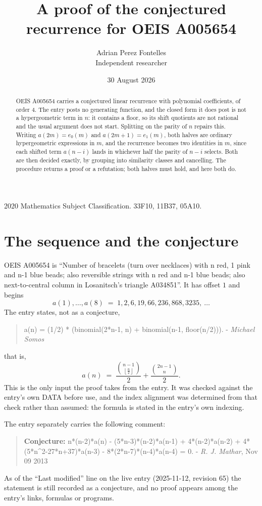 \documentclass[11pt,a4paper]{article}
\title{A proof of the conjectured recurrence for OEIS A005654}
\author{Adrian Perez Fontelles\\ \small Independent researcher}
\date{30 August 2026}
\theoremstyle{plain}
\theoremstyle{definition}
\begin{document}
\maketitle

\begin{abstract}
OEIS A005654 carries a conjectured linear recurrence with polynomial coefficients, of
order 4. The entry posts no generating function, and the closed form it does post
is not a hypergeometric term in $n$: it contains a floor, so its shift quotients are not
rational and the usual argument does not start. Splitting on the parity of $n$ repairs
this. Writing $a(2m)=e_{0}(m)$ and $a(2m+1)=e_{1}(m)$, both halves are ordinary
hypergeometric expressions in $m$, and the recurrence becomes two identities in $m$, since
each shifted term $a(n-i)$ lands in whichever half the parity of $n-i$ selects. Both are
then decided exactly, by grouping into similarity classes and cancelling. The procedure
returns a proof or a refutation; both halves must hold, and here both do.
\end{abstract}

\noindent\small 2020 Mathematics Subject Classification. 33F10, 11B37, 05A10.\normalsize

\section{The sequence and the conjecture}

OEIS A005654 is ``Number of bracelets (turn over necklaces) with n red, 1 pink and n-1 blue beads; also reversible strings with n red and n-1 blue beads; also next-to-central column in Losanitsch's triangle A034851''. It has offset $1$ and begins
\[
a(1),\dots,a(8)\;=\;1, 2, 6, 19, 66, 236, 868, 3235,\ \dots
\]
The entry states, not as a conjecture,
\begin{quote}\small
a(n) = (1/2) * (binomial(2*n-1, n) + binomial(n-1, floor(n/2))). - \emph{Michael Somos}
\end{quote}
that is,
\begin{equation}\label{eq:cf}
a(n)\;=\;\frac{{\binom{n - 1}{\left\lfloor{\frac{n}{2}}\right\rfloor}}}{2} + \frac{{\binom{2 n - 1}{n}}}{2} .
\end{equation}
This is the only input the proof takes from the entry. It was checked against the entry's
own DATA before use, and the index alignment was determined from that check rather than
assumed: the formula is stated in the entry's own indexing.

The entry separately carries the following comment:
\begin{quote}\small
\textbf{Conjecture:} n*(n-2)*a(n) - (5*n-3)*(n-2)*a(n-1) + 4*(n-2)*a(n-2) + 4*(5*n\^{}2-27*n+37)*a(n-3) - 8*(2*n-7)*(n-4)*a(n-4) = 0. - \emph{R. J. Mathar}, Nov 09 2013
\end{quote}
As of the ``Last modified'' line on the live entry (2025-11-12, revision 65) the
statement is still recorded as a conjecture, and no proof appears among the entry's links,
formulas or programs.
\end{document}

